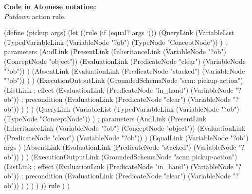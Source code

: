 \begin{footnotesize}
\textbf{Code in Atomese notation:} \\
\textit{Putdown} action rule.
\end{footnotesize}

\begin{python}
(define (pickup args)
  (let 
    ((rule
      (if (equal? args `())
        (QueryLink
          (VariableList
            (TypedVariableLink 
              (VariableNode "?ob") 
              (TypeNode "ConceptNode"))
          ) ; parameters
          (AndLink
            (PresentLink
              (InheritanceLink
                (VariableNode "?ob")
                (ConceptNode "object"))
              (EvaluationLink
                (PredicateNode "clear")
                (VariableNode "?ob"))
            )
            (AbsentLink
              (EvaluationLink
                (PredicateNode "stacked")
                (VariableNode "?ob"))
            )
          )
          (ExecutionOutputLink
            (GroundedSchemaNode "scm: pickup-action")
            (ListLink
              ; effect
              (EvaluationLink
                (PredicateNode "in_hand")
                (VariableNode "?ob"))
              ; precondition
              (EvaluationLink
                (PredicateNode "clear")
                (VariableNode "?ob"))
            )
          )
        )
        (QueryLink
          (VariableList
            (TypedVariableLink 
              (VariableNode "?ob") 
              (TypeNode "ConceptNode"))
          ) ; parameters
          (AndLink
            (PresentLink
              (InheritanceLink
                (VariableNode "?ob")
                (ConceptNode "object"))
              (EvaluationLink
                (PredicateNode "clear")
                (VariableNode "?ob"))
            )
            (EqualLink
              (VariableNode "?ob")
              args
            )
            (AbsentLink
              (EvaluationLink
                (PredicateNode "stacked")
                (VariableNode "?ob"))
            )
          )
          (ExecutionOutputLink
            (GroundedSchemaNode "scm: pickup-action")
            (ListLink
              ; effect
              (EvaluationLink
                (PredicateNode "in_hand")
                (VariableNode "?ob"))
              ; precondition
              (EvaluationLink
                (PredicateNode "clear")
                (VariableNode "?ob"))
            )
          )
        )
      )
    ))
    rule
  )
)
\end{python}

